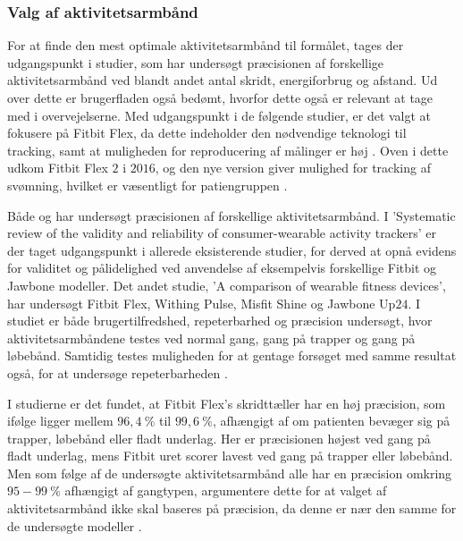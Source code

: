 \subsubsection{Valg af aktivitetsarmbånd}

For at finde den mest optimale aktivitetsarmbånd til formålet, tages der udgangspunkt i studier, som har undersøgt præcisionen af forskellige aktivitetsarmbånd ved blandt andet antal skridt, energiforbrug og afstand. Ud over dette er brugerfladen også bedømt, hvorfor dette også er relevant at tage med i overvejelserne. Med udgangspunkt i de følgende studier, er det valgt at fokusere på Fitbit Flex, da dette indeholder den nødvendige teknologi til tracking, samt at muligheden for reproducering af målinger er høj \citep{kaewkannate2016}. Oven i dette udkom Fitbit Flex $2$ i $2016$, og den nye version giver mulighed for tracking af svømning, hvilket er væsentligt for patiengruppen \citep{fitbitflex}.

Både \citeauthor{evenson2015} og \citeauthor{kaewkannate2016} har undersøgt præcisionen af forskellige aktivitetsarmbånd. I 'Systematic review of the validity and reliability of consumer-wearable activity trackers' er der taget udgangspunkt i allerede eksisterende studier, for derved at opnå evidens for validitet og pålidelighed ved anvendelse af eksempelvis forskellige Fitbit og Jawbone modeller. Det andet studie, 'A comparison of wearable fitness devices', har undersøgt Fitbit Flex, Withing Pulse, Misfit Shine og Jawbone Up$24$. I studiet er både brugertilfredshed, repeterbarhed og præcision undersøgt, hvor aktivitetsarmbåndene testes ved normal gang, gang på trapper og gang på løbebånd. Samtidig testes muligheden for at gentage forsøget med samme resultat også, for at undersøge repeterbarheden \citep{evenson2015, kaewkannate2016}.

I studierne er det fundet, at Fitbit Flex's skridttæller har en høj præcision, som ifølge \citeauthor{kaewkannate2016} ligger mellem $96,4~\%$ til $99,6~\%$, afhængigt af om patienten bevæger sig på trapper, løbebånd eller fladt underlag. Her er præcisionen højest ved gang på fladt underlag, mens Fitbit uret scorer lavest ved gang på trapper eller løbebånd. Men som følge af de undersøgte aktivitetsarmbånd alle har en præcision omkring $95-99~\%$ afhængigt af gangtypen, argumentere dette for at valget af aktivitetsarmbånd ikke skal baseres på præcision, da denne er nær den samme for de undersøgte modeller \citep{kaewkannate2016}.

